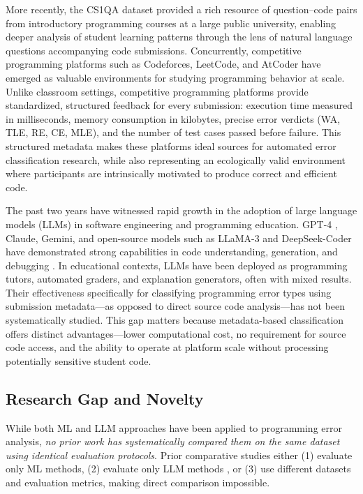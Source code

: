 \documentclass[10pt,a4paper]{article}
\begin{document}
More recently, the CS1QA dataset \cite{lee2022cs1qa} provided a rich resource
of question--code pairs from introductory programming courses at a large
public university, enabling deeper analysis of student learning patterns
through the lens of natural language questions accompanying code submissions.
Concurrently, competitive programming platforms such as Codeforces, LeetCode,
and AtCoder have emerged as valuable environments for studying programming
behavior at scale. Unlike classroom settings, competitive programming
platforms provide standardized, structured feedback for every submission:
execution time measured in milliseconds, memory consumption in kilobytes,
precise error verdicts (WA, TLE, RE, CE, MLE), and the number of test cases
passed before failure. This structured metadata makes these platforms ideal
sources for automated error classification research, while also representing
an ecologically valid environment where participants are intrinsically
motivated to produce correct and efficient code.

The past two years have witnessed rapid growth in the adoption of large
language models (LLMs) in software engineering and programming education.
GPT-4 \cite{openai2024gpt4}, Claude, Gemini, and open-source models such as
LLaMA-3 \cite{dubey2024llama} and DeepSeek-Coder have demonstrated strong capabilities in code
understanding, generation, and debugging \cite{raihan2025large}\cite{zamfirescu2023what}\cite{prather2024code}\cite{kazemitabaar2024impact}. In educational contexts, LLMs have been deployed as
programming tutors, automated graders, and explanation generators, often with
mixed results. Their effectiveness specifically for classifying
programming error types using submission metadata---as opposed to direct
source code analysis---has not been systematically studied. This gap matters
because metadata-based classification offers distinct advantages---lower
computational cost, no requirement for source code access, and the ability to
operate at platform scale without processing potentially sensitive student
code.


\subsection*{Research Gap and Novelty}

While both ML and LLM approaches have been applied to programming error
analysis, \textit{no prior work has systematically compared them on the same
dataset using identical evaluation protocols}. Prior comparative studies either
(1) evaluate only ML methods,
(2) evaluate only LLM methods \cite{raihan2025large,zamfirescu2023what},
or (3) use different datasets and evaluation metrics, making direct comparison
impossible.
\end{document}
